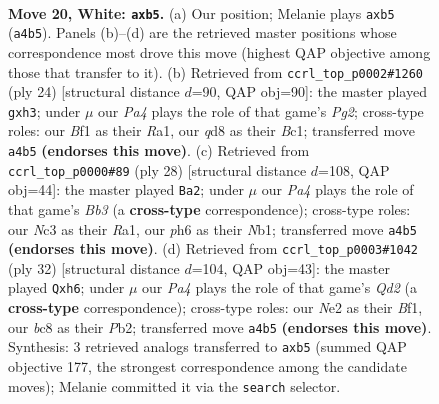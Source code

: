 \documentclass[11pt]{article}
\begin{document}
\clearpage

\begin{figure}[p]\centering
\begin{subfigure}{0.46\textwidth}\centering
\resizebox{\linewidth}{!}{%
\newchessgame
\chessboard[
  setfen={rnbq4/pp4kp/4r2p/1p1p4/P2P2Pb/2N1PP2/2QKN3/R4B1R w - - 0 20},
  showmover=false,
  pgfstyle=straightmove, color=movearrow, markmove={a4-b5}
]}
\caption{}
\end{subfigure}\hfill
\begin{subfigure}{0.46\textwidth}\centering
\resizebox{\linewidth}{!}{%
\newchessgame
\chessboard[
  setfen={r1bqk2r/ppp2pbp/3p4/8/1n2P3/1PN4p/P1PQNPP1/R1B1K2R w KQkq - 0 13},
  showmover=false,
  pgfstyle=straightmove, color=movearrow, markmove={g2-h3}
]}
\caption{}
\end{subfigure}
\\[4pt]
\begin{subfigure}{0.46\textwidth}\centering
\resizebox{\linewidth}{!}{%
\newchessgame
\chessboard[
  setfen={1rbqk2r/5ppp/3p1b2/np2p3/4P3/1BN5/1PP2PPP/RN1QK2R w KQk - 0 15},
  showmover=false,
  pgfstyle=straightmove, color=movearrow, markmove={b3-a2}
]}
\caption{}
\end{subfigure}\hfill
\begin{subfigure}{0.46\textwidth}\centering
\resizebox{\linewidth}{!}{%
\newchessgame
\chessboard[
  setfen={r1b1r1k1/3n1p1n/pq1p2pb/2pP4/4P3/R1N2P2/1P1QN1PP/4KB1R w K - 0 17},
  showmover=false,
  pgfstyle=straightmove, color=movearrow, markmove={d2-h6}
]}
\caption{}
\end{subfigure}
\caption{\textbf{Move 20, White: \texttt{axb5}.} (a) Our position; Melanie plays \texttt{axb5} (\texttt{a4b5}). Panels (b)--(d) are the retrieved master positions whose correspondence most drove this move (highest QAP objective among those that transfer to it). (b) Retrieved from \texttt{ccrl\_top\_p0002\#1260} (ply 24) [structural distance $d$=90, QAP obj=90]: the master played \texttt{gxh3}; under $\mu$ our \emph{Pa4} plays the role of that game's \emph{Pg2}; cross-type roles: our \emph{B}f1 as their \emph{R}a1, our \emph{q}d8 as their \emph{B}c1; transferred move \texttt{a4b5} \textbf{(endorses this move)}. (c) Retrieved from \texttt{ccrl\_top\_p0000\#89} (ply 28) [structural distance $d$=108, QAP obj=44]: the master played \texttt{Ba2}; under $\mu$ our \emph{Pa4} plays the role of that game's \emph{Bb3} (a \textbf{cross-type} correspondence); cross-type roles: our \emph{N}c3 as their \emph{R}a1, our \emph{p}h6 as their \emph{N}b1; transferred move \texttt{a4b5} \textbf{(endorses this move)}. (d) Retrieved from \texttt{ccrl\_top\_p0003\#1042} (ply 32) [structural distance $d$=104, QAP obj=43]: the master played \texttt{Qxh6}; under $\mu$ our \emph{Pa4} plays the role of that game's \emph{Qd2} (a \textbf{cross-type} correspondence); cross-type roles: our \emph{N}e2 as their \emph{B}f1, our \emph{b}c8 as their \emph{P}b2; transferred move \texttt{a4b5} \textbf{(endorses this move)}. Synthesis: 3 retrieved analogs transferred to \texttt{axb5} (summed QAP objective 177, the strongest correspondence among the candidate moves); Melanie committed it via the \texttt{search} selector.}
\label{fig:thought-m38}
\end{figure}
\end{document}
